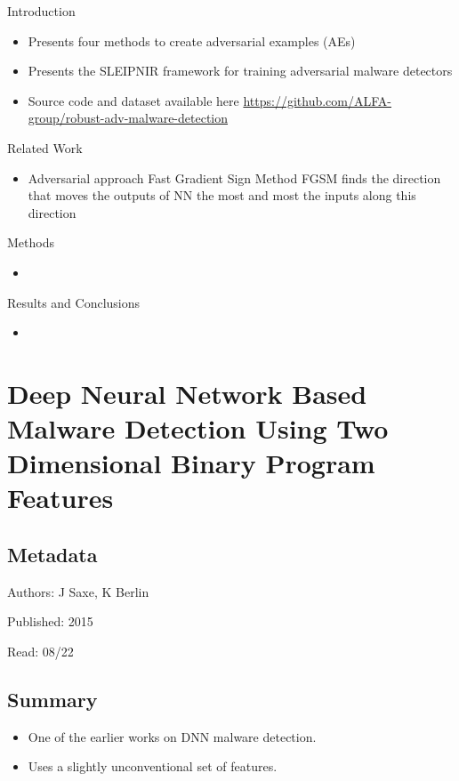 \documentclass{article}
\begin{document}
Introduction
\begin{itemize}
\item Presents four methods to create adversarial examples (AEs)
\item Presents the SLEIPNIR framework for training adversarial malware detectors
\item Source code and dataset available here \url{https://github.com/ALFA-group/robust-adv-malware-detection}
\end{itemize}
Related Work
\begin{itemize}
\item Adversarial approach Fast Gradient Sign Method FGSM finds the direction that moves the outputs of NN the most and most the inputs along this direction
\end{itemize}
Methods
\begin{itemize}
\item
\end{itemize}
Results and Conclusions
\begin{itemize}
\item
\end{itemize}
\pagebreak


\section*{Deep Neural Network Based Malware Detection Using Two Dimensional Binary Program Features}

\subsection*{Metadata}

\noindent Authors: J Saxe, K Berlin

\noindent Published: 2015

\noindent Read: 08/22

\subsection*{Summary}
\begin{itemize}
\item One of the earlier works on DNN malware detection.
\item Uses a slightly unconventional set of features.
\end{itemize}
\end{document}
